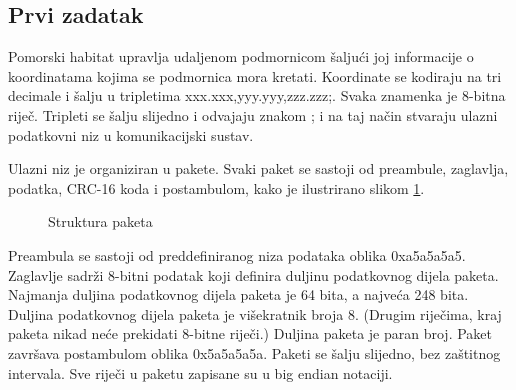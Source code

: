 \documentclass[a4paper]{article}
\begin{document}
\subsection{Prvi zadatak}
Pomorski habitat upravlja udaljenom podmornicom šaljući joj informacije o koordinatama kojima se podmornica mora kretati. Koordinate se kodiraju na tri decimale i šalju u tripletima xxx.xxx,yyy.yyy,zzz.zzz;. Svaka znamenka je 8-bitna riječ. Tripleti se šalju slijedno i odvajaju znakom ; i na taj način stvaraju ulazni podatkovni niz u komunikacijski sustav.

Ulazni niz je organiziran u pakete. Svaki paket se sastoji od preambule, zaglavlja, podatka, CRC-16 koda i postambulom, kako je ilustrirano slikom \ref{fig:packet}.


\begin{figure}[h!]
\centering
{}
\caption{Struktura paketa}
\label{fig:packet}
\end{figure}

Preambula se sastoji od preddefiniranog niza podataka oblika 0xa5a5a5a5. Zaglavlje sadrži 8-bitni podatak koji definira duljinu podatkovnog dijela paketa. Najmanja duljina podatkovnog dijela paketa je 64 bita, a najveća 248 bita. Duljina podatkovnog dijela paketa je višekratnik broja 8. (Drugim riječima, kraj paketa nikad neće prekidati 8-bitne riječi.) Duljina paketa je paran broj. Paket završava postambulom oblika 0x5a5a5a5a. Paketi se šalju slijedno, bez zaštitnog intervala. Sve riječi u paketu zapisane su u big endian notaciji.
\end{document}
